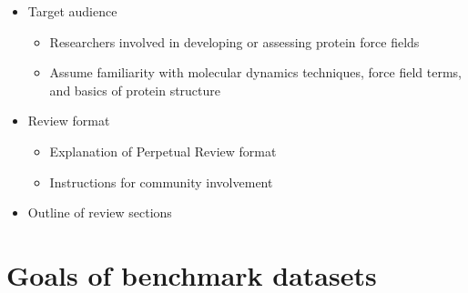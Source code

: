 \documentclass[9pt,review]{livecoms}
\begin{document}
\begin{itemize}
\item Target audience

	\begin{itemize}
	\item Researchers involved in developing or assessing protein force fields
	\item Assume familiarity with molecular dynamics techniques, force field terms, and basics of protein structure
	\end{itemize}

\item Review format

	\begin{itemize}
	\item Explanation of Perpetual Review format
	\item Instructions for community involvement
	\end{itemize}

\item Outline of review sections

\end{itemize}

\section{Goals of benchmark datasets}
\end{document}
